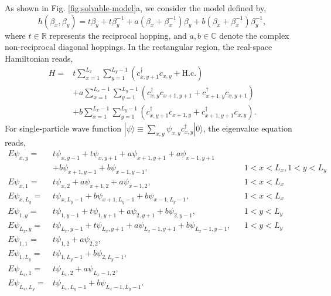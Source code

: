 \documentclass[pdflatex,sn-nature, iicol]{sn-jnl}%
\theoremstyle{thmstyleone}%
\theoremstyle{thmstyletwo}%
\theoremstyle{thmstylethree}%
\begin{document}
As shown in Fig. \ref{fig:solvable-model}a, we consider the model
defined by,
\begin{equation}
h\left(\beta_{x},\beta_{y}\right)=t\beta_{y}+t\beta_{y}^{-1}+a\left(\beta_{x}+\beta_{x}^{-1}\right)\beta_{y}+b\left(\beta_{x}+\beta_{x}^{-1}\right)\beta_{y}^{-1},\label{eq:solvable-model-h}
\end{equation}
where $t\in\mathbb{R}$ represents the reciprocal hopping, and $a,b\in\mathbb{C}$
denote the complex non-reciprocal diagonal hoppings. In the rectangular
region, the real-space Hamiltonian reads, 
\begin{align}
H= & t\sum_{x=1}^{L_{x}}\sum_{y=1}^{L_{y}-1}\left(c_{x,y+1}^{\dagger}c_{x,y}+\text{H.c.}\right)\nonumber \\
 & +a\sum_{x=1}^{L_{x}-1}\sum_{y=1}^{L_{y}-1}\left(c_{x,y}^{\dagger}c_{x+1,y+1}+c_{x+1,y}^{\dagger}c_{x,y+1}\right)\nonumber \\
 & +b\sum_{x=1}^{L_{x}-1}\sum_{y=1}^{L_{y}-1}\left(c_{x,y+1}^{\dagger}c_{x+1,y}+c_{x+1,y+1}^{\dagger}c_{x,y}\right).\label{eq:solvable-model-realspace}
\end{align}
For single-particle wave function $|\psi\rangle\equiv\sum_{x,y}\psi_{x,y}c_{x,y}^{\dagger}|0\rangle$,
the eigenvalue equation reads, \begin{subequations}\label{eq:solvable-psi}
\begin{align}
E\psi_{x,y}= & t\psi_{x,y-1}+t\psi_{x,y+1}+a\psi_{x+1,y+1}+a\psi_{x-1,y+1}\nonumber \\
 & +b\psi_{x+1,y-1}+b\psi_{x-1,y-1}, &  & 1<x<L_{x},1<y<L_{y}\\
E\psi_{x,1}= & t\psi_{x,2}+a\psi_{x+1,2}+a\psi_{x-1,2}, &  & 1<x<L_{x}\\
E\psi_{x,L_{y}}= & t\psi_{x,L_{y}-1}+b\psi_{x+1,L_{y}-1}+b\psi_{x-1,L_{y}-1}, &  & 1<x<L_{x}\\
E\psi_{1,y}= & t\psi_{1,y-1}+t\psi_{1,y+1}+a\psi_{2,y+1}+b\psi_{2,y-1}, &  & 1<y<L_{y}\\
E\psi_{L_{x},y}= & t\psi_{L_{x},y-1}+t\psi_{L_{x},y+1}+a\psi_{L_{x}-1,y+1}+b\psi_{L_{x}-1,y-1}, &  & 1<y<L_{y}\\
E\psi_{1,1}= & t\psi_{1,2}+a\psi_{2,2},\\
E\psi_{1,L_{y}}= & t\psi_{1,L_{y}-1}+b\psi_{2,L_{y}-1},\\
E\psi_{L_{x},1}= & t\psi_{L_{x},2}+a\psi_{L_{x}-1,2},\\
E\psi_{L_{x},L_{y}}= & t\psi_{L_{x},L_{y}-1}+b\psi_{L_{x}-1,L_{y}-1}.
\end{align}
\end{subequations}
\end{document}
